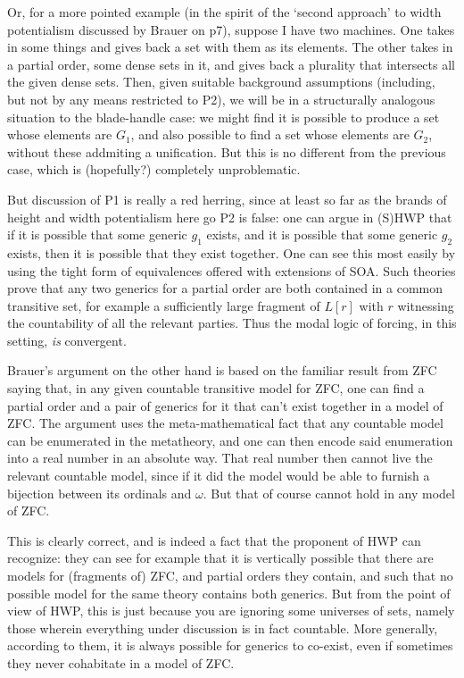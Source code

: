 \documentclass{article}
\begin{document}
Or, for a more pointed example (in the spirit of the `second approach' to width 
potentialism discussed by Brauer on p7), suppose I have two machines. 
One takes in some things and gives back a set with them as its elements.
The other takes in a 
partial order, some dense sets in it, and gives back a plurality that 
intersects all the given dense sets. Then, given suitable background assumptions 
(including, but not by any means restricted to P2),
we will be in a structurally analogous situation to the blade-handle 
case: we might find it is possible to produce a set whose elements are $G_1$,
and also possible to find a set whose elements are $G_2$,
without these addmiting a unification.
But this is no different from the previous case, which is (hopefully?) completely 
unproblematic.

But discussion of P1 is really a red herring, since at least so far as the 
brands of height and width potentialism here go P2 is false:
one can argue in (S)HWP that if it is possible that some generic 
$g_1$ exists, and it is possible that some generic $g_2$ exists, then it is 
possible that they exist together. One can see this most easily by using 
the tight form of equivalences offered with extensions of SOA. 
Such theories prove that
any two generics for a partial order are both contained in a common transitive 
set, for example a sufficiently large fragment of $L[r]$ with $r$ witnessing 
the countability of all the relevant parties.
Thus the modal logic of forcing, in this 
setting, \emph{is} convergent. 

Brauer's argument on the other hand is based on the familiar result from ZFC saying 
that, in any given countable transitive model for ZFC, one can find a partial 
order and a pair of generics for it that can't exist together in a model of ZFC.
The argument uses the meta-mathematical fact that any countable model can be 
enumerated in the metatheory, and one can then encode said enumeration into a 
real number in an absolute way. That real number then cannot live the relevant 
countable model, since if it did the model would be able to furnish a bijection 
between its ordinals and $\omega$. But that of course cannot hold in any model of ZFC.

This is clearly correct, and is indeed a fact that the proponent of HWP can 
recognize: they can see for example that it is vertically possible that there
are models for (fragments of) ZFC, and partial orders they contain, and such that no 
possible model for the same theory contains both generics. But from the point of 
view of HWP, this is just because you are ignoring some universes of sets, namely those 
wherein everything under discussion is in fact countable. More generally, according 
to them, it is always possible for generics to co-exist, even if 
sometimes they never cohabitate in a model of ZFC.
\end{document}
